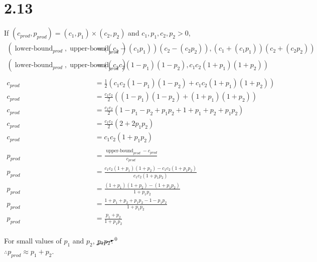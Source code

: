 \documentclass{report}
\newcommand{\?}{\stackrel{?}{=}}
\newcommand{\<}{\stackrel{?}{<}}
\begin{document}
\section*{2.13}


If
$(c_{prod}, p_{prod}) = (c_1, p_1) \times (c_2, p_2)$
and
$c_1, p_1, c_2, p_2 > 0$,\\

\begin{align}
 (\operatorname{lower-bound}_{prod}, \operatorname{upper-bound}_{prod}) &= ((c_1 - (c_1p_1))(c_2 - (c_2p_2)), (c_1 + (c_1p_1))(c_2 + (c_2p_2))\\
 (\operatorname{lower-bound}_{prod}, \operatorname{upper-bound}_{prod}) &= ((c_1c_2(1 - p_1)(1 - p_2), c_1c_2(1 + p_1)(1 + p_2))\\
 \\
 c_{prod} &= \frac{1}{2}(c_1c_2(1-p_1)(1-p_2) + c_1c_2(1+p_1)(1+p_2))\\
 c_{prod} &= \frac{c_1c_2}{2}((1-p_1)(1-p_2) + (1+p_1)(1+p_2))\\
 c_{prod} &= \frac{c_1c_2}{2}(1 - p_1 - p_2 + p_1p_2 + 1 + p_1 + p_2 + p_1p_2)\\
 c_{prod} &= \frac{c_1c_2}{2}(2 +  2p_1p_2)\\
 c_{prod} &= c_1c_2(1 +  p_1p_2)\\
 \\
 p_{prod} &= \frac{\operatorname{upper-bound}_{prod} - c_{prod}}{c_{prod}}\\
 p_{prod} &= \frac{c_1c_2(1 + p_1)(1 + p_2) - c_1c_2(1 +  p_1p_2)}{c_1c_2(1 +  p_1p_2)}\\
 p_{prod} &= \frac{(1 + p_1)(1 + p_2) - (1 +  p_1p_2)}{1 +  p_1p_2}\\
 p_{prod} &= \frac{1 + p_1 + p_2 + p_1p_2 - 1 -  p_1p_2}{1 +  p_1p_2}\\
 p_{prod} &= \frac{p_1 + p_2}{1 + p_1p_2}
\end{align}\\

For small values of $p_1$ and $p_2$, $\cancelto{0}{p_1p_2}$.\\
$\therefore p_{prod} \approx p_1 + p_2$.
\end{document}
